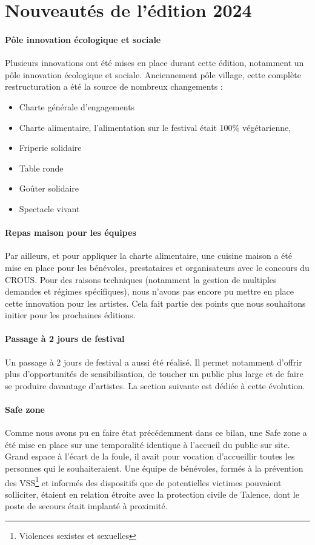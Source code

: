 \documentclass[12pt,a4paper]{report}
\begin{document}
\section{Nouveautés de l'édition 2024}

\paragraph{Pôle innovation écologique et sociale}
Plusieurs innovations ont été mises en place durant cette édition, notamment un pôle innovation écologique et sociale. Anciennement pôle village, cette complète restructuration a été la source de nombreux changements : 
\begin{itemize}
\item Charte générale d’engagements
\item Charte alimentaire, l'alimentation sur le festival était 100\% végétarienne,
\item Friperie solidaire
\item Table ronde
\item Goûter solidaire
\item Spectacle vivant
\end{itemize}

\paragraph{Repas maison pour les équipes}
Par ailleurs, et pour appliquer la charte alimentaire, une cuisine maison a été mise en place pour les bénévoles, prestataires et organisateurs avec le concours du CROUS. Pour des raisons techniques (notamment la gestion de multiples demandes et régimes spécifiques), nous n'avons pas encore pu mettre en place cette innovation pour les artistes. Cela fait partie des points que nous souhaitons initier pour les prochaines éditions.

\paragraph{Passage à 2 jours de festival}
Un passage à 2 jours de festival a aussi été réalisé. Il permet notamment d'offrir plus d'opportunités de sensibilisation, de toucher un public plus large et de faire se produire davantage d'artistes. La section suivante est dédiée à cette évolution.

\paragraph{Safe zone}
Comme nous avons pu en faire état précédemment dans ce bilan, une \og Safe zone \fg{} a été mise en place sur une temporalité identique à l'accueil du public sur site. Grand espace à l'écart de la foule, il avait pour vocation d'accueillir toutes les personnes qui le souhaiteraient. Une équipe de bénévoles, formés à la prévention des VSS\footnote{Violences sexistes et sexuelles} et informés des dispositifs que de potentielles victimes pouvaient solliciter, étaient en relation étroite avec la protection civile de Talence, dont le poste de secours était implanté à proximité. 
\end{document}
